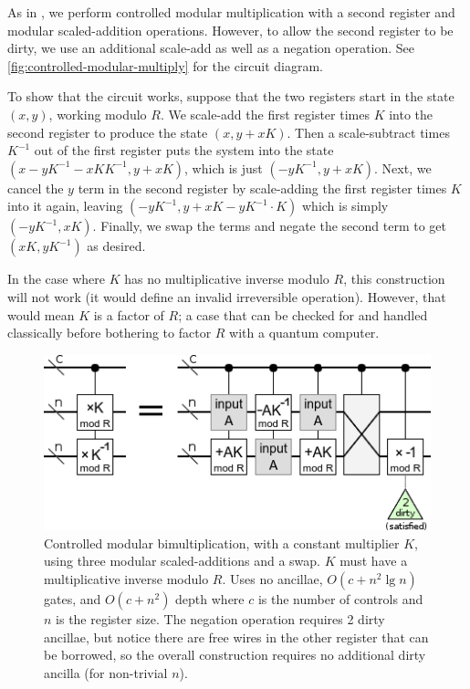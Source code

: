 \documentclass[twocolumn,longbibliography]{quantumarticle-customized}
\begin{document}
As in \cite{beauregard2003}, we perform controlled modular multiplication with a second register and modular scaled-addition operations.
However, to allow the second register to be dirty, we use an additional scale-add as well as a negation operation.
See \autoref{fig:controlled-modular-multiply} for the circuit diagram.

To show that the circuit works, suppose that the two registers start in the state $(x, y)$, working modulo $R$.
We scale-add the first register times $K$ into the second register to produce the state $(x, y+xK)$.
Then a scale-subtract times $K^{-1}$ out of the first register puts the system into the state $(x-yK^{-1}-xKK^{-1}, y+xK)$, which is just $(-yK^{-1}, y+xK)$.
Next, we cancel the $y$ term in the second register by scale-adding the first register times $K$ into it again, leaving $(-yK^{-1}, y+xK-yK^{-1} \cdot K)$ which is simply $(-yK^{-1}, xK)$.
Finally, we swap the terms and negate the second term to get $(xK, yK^{-1})$ as desired.

In the case where $K$ has no multiplicative inverse modulo $R$, this construction will not work (it would define an invalid irreversible operation).
However, that would mean $K$ is a factor of $R$; a case that can be checked for and handled classically before bothering to factor $R$ with a quantum computer.

\begin{figure}
  \centering
  \includegraphics[width=\linewidth]{assets/controlled-modular-multiply.png}
  \caption{
    Controlled modular bimultiplication, with a constant multiplier $K$, using three modular scaled-additions and a swap.
    $K$ must have a multiplicative inverse modulo $R$.
    Uses no ancillae, $O(c + n^2 \lg n)$ gates, and $O(c + n^2)$ depth where $c$ is the number of controls and $n$ is the register size.
    The negation operation requires 2 dirty ancillae, but notice there are free wires in the other register that can be borrowed, so the overall construction requires no additional dirty ancilla (for non-trivial $n$).
  }
  \label{fig:controlled-modular-multiply}
\end{figure}
\end{document}
